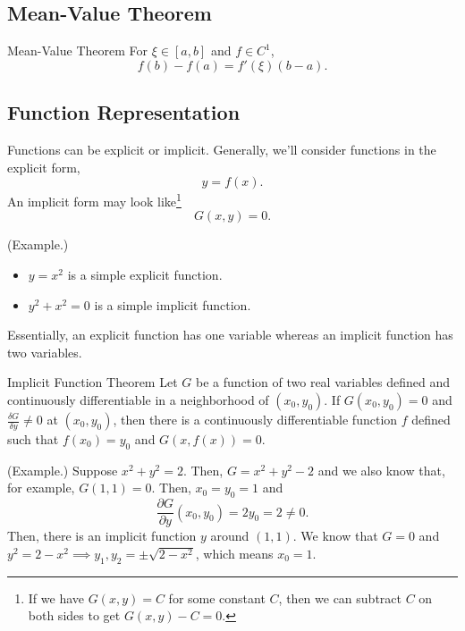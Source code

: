 \documentclass[letterpaper]{article}
\begin{document}
\subsection{Mean-Value Theorem}
\begin{theorem}{Mean-Value Theorem}{}
    For $\xi \in [a, b]$ and $f \in C^1$, \[f(b) - f(a) = f'(\xi)(b - a). \]
\end{theorem}

\subsection{Function Representation}
Functions can be explicit or implicit. Generally, we'll consider functions in the explicit form, \[y = f(x).\]
An implicit form may look like\footnote{If we have $G(x, y) = C$ for some constant $C$, then we can subtract $C$ on both sides to get $G(x, y) - C = 0$.} \[G(x, y) = 0.\]
\begin{mdframed}
    (Example.) 
    \begin{itemize}
        \item $y = x^2$ is a simple explicit function. 
        \item $y^2 + x^2 = 0$ is a simple implicit function. 
    \end{itemize}
\end{mdframed}
Essentially, an explicit function has one variable whereas an implicit function has two variables. 

\begin{theorem}{Implicit Function Theorem}{}
    Let $G$ be a function of two real variables defined and continuously differentiable in a neighborhood of $(x_0, y_0)$. If $G(x_0, y_0) = 0$ and $\frac{\delta G}{\delta y} \neq 0$ at $(x_0, y_0)$, then there is a continuously differentiable function $f$ defined such that $f(x_0) = y_0$ and $G(x, f(x)) = 0$. 
\end{theorem}

\begin{mdframed}
    (Example.) Suppose $x^2 + y^2 = 2$. Then, $G = x^2 + y^2 - 2$ and we also know that, for example, $G(1, 1) = 0$. Then, $x_0 = y_0 = 1$ and \[\frac{\partial G}{\partial y}(x_0, y_0) = 2y_0 = 2 \neq 0.\] Then, there is an implicit function $y$ around $(1, 1)$. We know that $G = 0$ and $y^2 = 2 - x^2 \implies y_1, y_2 = \pm\sqrt{2 - x^2}$, which means $x_0 = 1$.
\end{mdframed}
\end{document}
